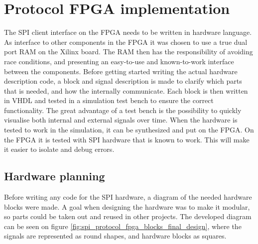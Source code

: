\section{Protocol FPGA implementation}
The SPI client interface on the FPGA needs to be written in hardware language. As interface to other components in the FPGA it was chosen to use a true dual port RAM on the Xilinx board. The RAM then has the responsibility of avoiding race conditions, and presenting an easy-to-use and known-to-work interface between the components. 
Before getting started writing the actual hardware description code, a block and signal description is made to clarify which parts that is needed, and how the internally communicate. Each block is then written in VHDL and tested in a simulation test bench to ensure the correct functionality. The great advantage of a test bench is the possibility to quickly visualise both internal and external signals over time. When the hardware is tested to work in the simulation, it can be synthesized and put on the FPGA. On the FPGA it is tested with SPI hardware that is known to work. This will make it easier to isolate and debug errors.


\subsection{Hardware planning}
Before writing any code for the SPI hardware, a diagram of the needed hardware blocks were made. A goal when designing the hardware was to make it modular, so parts could be taken out and reused in other projects. The developed diagram can be seen on figure \ref{fig:spi_protocol_fpga_blocks_final_design}, where the signals are represented as round shapes, and hardware blocks as squares. 

